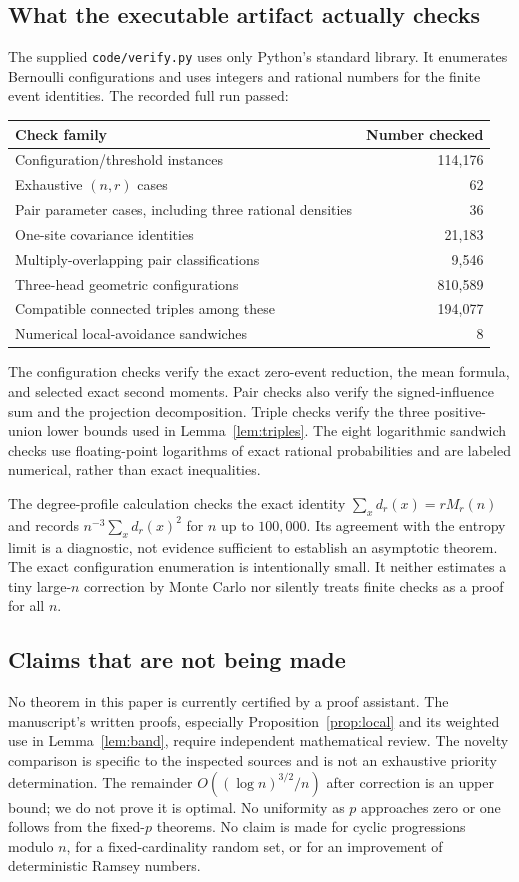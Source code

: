 \documentclass[11pt]{article}
\theoremstyle{definition}\newtheorem{definition}[theorem]{Definition}
\theoremstyle{remark}\newtheorem{remark}[theorem]{Remark}
\begin{document}
\subsection{What the executable artifact actually checks}
The supplied \texttt{code/verify.py} uses only Python's standard library.
It enumerates Bernoulli configurations and uses integers and rational
numbers for the finite event identities. The recorded full run passed:
\begin{center}
\begin{tabular}{lr}
\toprule
Check family & Number checked\\
\midrule
Configuration/threshold instances & 114,176\\
Exhaustive $(n,r)$ cases & 62\\
Pair parameter cases, including three rational densities & 36\\
One-site covariance identities & 21,183\\
Multiply-overlapping pair classifications & 9,546\\
Three-head geometric configurations & 810,589\\
Compatible connected triples among these & 194,077\\
Numerical local-avoidance sandwiches & 8\\
\bottomrule
\end{tabular}
\end{center}
The configuration checks verify the exact zero-event reduction, the mean
formula, and selected exact second moments. Pair checks also verify the
signed-influence sum and the projection decomposition. Triple checks
verify the three positive-union lower bounds used in
Lemma~\ref{lem:triples}. The eight logarithmic sandwich checks use
floating-point logarithms of exact rational probabilities and are labeled
numerical, rather than exact inequalities.

The degree-profile calculation checks the exact identity
$\sum_xd_r(x)=rM_r(n)$ and records
$n^{-3}\sum_xd_r(x)^2$ for $n$ up to $100{,}000$.
Its agreement with the entropy limit is a diagnostic, not evidence
sufficient to establish an asymptotic theorem.
The exact configuration enumeration is intentionally small. It neither
estimates a tiny large-$n$ correction by Monte Carlo nor silently treats
finite checks as a proof for all $n$.

\subsection{Claims that are not being made}
No theorem in this paper is currently certified by a proof assistant.
The manuscript's written proofs, especially
Proposition~\ref{prop:local} and its weighted use in
Lemma~\ref{lem:band}, require independent mathematical review.
The novelty comparison is specific to the inspected sources and is not
an exhaustive priority determination.
The remainder $O((\log n)^{3/2}/n)$ after correction is an upper bound;
we do not prove it is optimal.
No uniformity as $p$ approaches zero or one follows from the fixed-$p$
theorems. No claim is made for cyclic progressions modulo $n$, for a
fixed-cardinality random set, or for an improvement of deterministic
Ramsey numbers.
\end{document}
